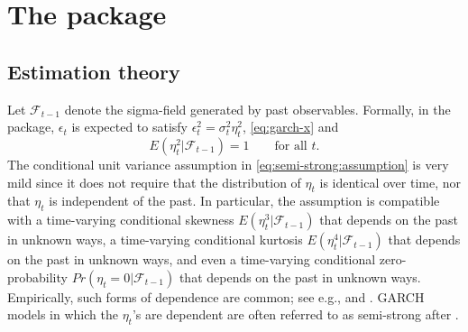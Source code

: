 \section{The  package}

\subsection{Estimation theory}

Let $\mathcal{F}_{t-1}$ denote the sigma-field generated by past observables. Formally, in the  package, $\epsilon_t$ is expected to satisfy $\epsilon_t^2 = \sigma_t^2\eta_t^2$, \eqref{eq:garch-x} and
%
\begin{equation}\label{eq:semi-strong:assumption}
	E(\eta_t^2 | \mathcal{F}_{t-1}) = 1 \qquad\text{for all $t$}.
\end{equation}
%
The conditional unit variance assumption in \eqref{eq:semi-strong:assumption} is very mild since it does not require that the distribution of $\eta_t$ is identical over time, nor that $\eta_t$ is independent of the past. In particular, the assumption is compatible with a time-varying conditional skewness $E(\eta_t^3 | \mathcal{F}_{t-1})$ that depends on the past in unknown ways, a time-varying conditional kurtosis $E(\eta_t^4 | \mathcal{F}_{t-1})$ that depends on the past in unknown ways, and even a time-varying conditional zero-probability $Pr(\eta_t=0 | \mathcal{F}_{t-1})$ that depends on the past in unknown ways. Empirically, such forms of dependence are common; see e.g., \citet{Hansen1994} and \citet{SucarratGronneberg2020}. GARCH models in which the $\eta_t$'s are dependent are often referred to as semi-strong after \citet{DrostNijman1993}.

